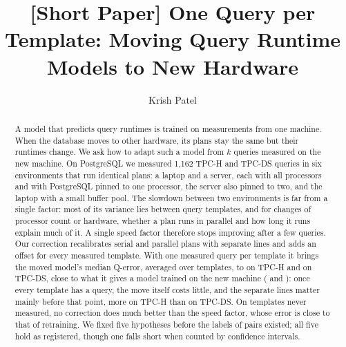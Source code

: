 \documentclass[sigconf,review]{acmart}
\begin{document}
\title{[Short Paper] One Query per Template: Moving Query Runtime Models to New Hardware}

\author{Krish Patel}

\renewcommand{\shortauthors}{Krish Patel}

\begin{abstract}
A model that predicts query runtimes is trained on measurements from one
machine. When the database moves to other hardware, its plans stay the
same but their runtimes change. We ask how to adapt such a model from $k$
queries measured on the new machine. On PostgreSQL we measured 1,162 TPC-H
and TPC-DS queries in six environments that run identical plans: a laptop
and a server, each with all processors and with PostgreSQL pinned to one
processor, the server also pinned to two, and the laptop with a small
buffer pool. The slowdown between two environments is far from a single
factor: most of its variance lies between query templates, and for changes
of processor count or hardware, whether a plan runs in parallel and how
long it runs explain much of it. A single speed factor therefore stops
improving after a few queries. Our correction recalibrates serial and
parallel plans with separate lines and adds an offset for every measured
template. With one measured query per template it brings the moved model's
median Q-error, averaged over templates, to
\PLadTpchLowdimTemplateRoundRobin{} on TPC-H and
\PLadTpcdsLowdimTemplateRoundRobin{} on TPC-DS, close to what it gives a
model trained on the new machine (\PLadTpchLowdimTemplateControlRoundRobin{}
and \PLadTpcdsLowdimTemplateControlRoundRobin): once every template has a
query, the move itself costs little, and the separate lines matter mainly
before that point, more on TPC-H than on TPC-DS. On templates never
measured, no correction does much better than the speed factor, whose error
is close to that of retraining. We fixed five hypotheses before the labels
of \PHPairs{} pairs existed; all five hold as registered, though one falls
short when counted by confidence intervals.
\end{abstract}


\maketitle
\end{document}
